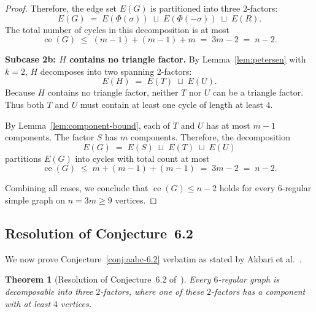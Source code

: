 \documentclass[11pt,reqno]{amsart}
\newtheorem{theorem}{Theorem}[section]
\theoremstyle{definition}
\theoremstyle{remark}
\DeclareMathOperator{\ce}{ce}
\begin{document}
\begin{proof}
Therefore, the edge set $E(G)$ is partitioned into three 2-factors:
\[
E(G) \;=\; E(\Phi(\sigma)) \;\sqcup\; E(\Phi(-\sigma)) \;\sqcup\; E(R).
\]
The total number of cycles in this decomposition is at most
\[
\ce(G) \;\le\; (m - 1) + (m - 1) + m \;=\; 3m - 2 \;=\; n - 2.
\]

\medskip
\noindent\textbf{Subcase 2b: $H$ contains no triangle factor.}
By Lemma~\ref{lem:petersen} with $k = 2$, $H$ decomposes into two spanning 2-factors:
\[
E(H) \;=\; E(T) \;\sqcup\; E(U).
\]
Because $H$ contains no triangle factor, neither $T$ nor $U$ can be a triangle factor. Thus both $T$ and $U$ must contain at least one cycle of length at least $4$.

By Lemma~\ref{lem:component-bound}, each of $T$ and $U$ has at most $m - 1$ components. The factor $S$ has $m$ components. Therefore, the decomposition
\[
E(G) \;=\; E(S) \;\sqcup\; E(T) \;\sqcup\; E(U)
\]
partitions $E(G)$ into cycles with total count at most
\[
\ce(G) \;\le\; m + (m - 1) + (m - 1) \;=\; 3m - 2 \;=\; n - 2.
\]

Combining all cases, we conclude that $\ce(G) \le n - 2$ holds for every $6$-regular simple graph on $n = 3m \ge 9$ vertices.
\end{proof}

\subsection{Resolution of Conjecture~6.2}

We now prove Conjecture~\ref{conj:aabc-6.2} verbatim as stated by Akbari et al.~\cite{AABC25}.

\begin{theorem}[Resolution of Conjecture~6.2 of~\cite{AABC25}]\label{thm:conjecture-verbatim}
Every $6$-regular graph is decomposable into three $2$-factors, where one of these $2$-factors has a component with at least $4$ vertices.
\end{theorem}
\end{document}
